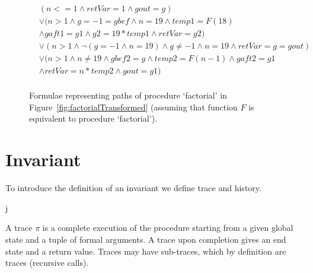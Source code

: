 \documentclass{llncs}
\newcommand{\foo}{\textit{foo}}
\newcommand{\trace}{\pi}
\newcommand{\pathCondition}{\mathit{T_{\foo}}}
\newcommand{\retVar}{\textit{retVar}}
\newcommand{\F}{\mathit{F}}
\newcommand{\n}{\textit{n}}
\newcommand{\g}{\textit{g}}
\newcommand{\gout}{\textit{gout}}
\newcommand{\gbef}{\textit{gbef}}
\newcommand{\gaft}{\textit{gaft}}
\begin{document}
\begin{figure}
  \begin{align*}
    &(n <= 1 \wedge retVar = 1 \wedge gout = g) \\
    &\vee (n > 1 \wedge g = -1 = gbef \wedge n = 19 \wedge temp1 = \F(18) \\
    &\wedge gaft1 = g1 \wedge g2 = 19 * temp1
    \wedge retVar = g2) \\
    &\vee (n > 1 \wedge \neg( g = -1 \wedge n = 19) \wedge g \neq -1
    \wedge n = 19 \wedge retVar = g = gout)\\
    &\vee (n > 1 \wedge n \neq 19 \wedge gbef2 = g \wedge temp2 = \F( n
    - 1) \wedge gaft2 = g1\\
    &\wedge retVar = n * temp2 \wedge gout = g1)\\
  \end{align*}
  \caption{Formulae representing paths of procedure `factorial' in
    Figure~\ref{fig:factorialTransformed} (assuming that
    function $\F$ is equivalent to procedure `factorial').}
  \label{fig:pathCondition}
\end{figure}




\section{Invariant}

To introduce the definition of an invariant we define trace and
history.

j\begin{definition}[trace]
  A trace $\trace$ is a complete execution of the procedure starting
  from a given global state and a tuple of formal arguments. A trace
  upon completion gives an end state and a return value. Traces may
  have sub-traces, which by definition are traces (recursive calls).
\end{definition}
\end{document}
